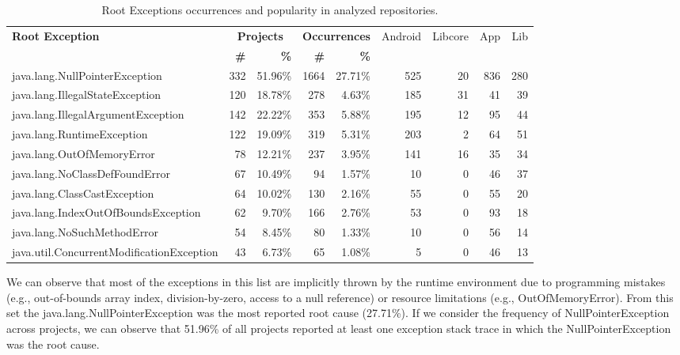 \begin{table}
  \tiny
  \centering
  \begin{tabular}{lrrrrrrrr}
    \hline
    \bfseries{Root Exception} &  \multicolumn{2}{c}{\bfseries{Projects}} &  \multicolumn{2}{c}{\bfseries{Occurrences}} & \textsf{Android} & \textsf{Libcore} & \textsf{App} & \textsf{Lib} \\
    & \bfseries{\#} &  \bfseries{\%} & \bfseries{\# } & \bfseries{\% } &&&&\\
    \hline

java.lang.NullPointerException	&	332	&	51.96\%	&	1664	&	27.71\%	&	525	&	20	&	836	&	280	\\
java.lang.IllegalStateException	&	120	&	18.78\%	&	278	&	4.63\%	&	185	&	31	&	41	&	39	\\
java.lang.IllegalArgumentException	&	142	&	22.22\%	&	353	&	5.88\%	&	195	&	12	&	95	&	44	\\
java.lang.RuntimeException	&	122	&	19.09\%	&	319	&	5.31\%	&	203	&	2	&	64	&	51	\\
java.lang.OutOfMemoryError	&	78	&	12.21\%	&	237	&	3.95\%	&	141	&	16	&	35	&	34	\\
java.lang.NoClassDefFoundError	&	67	&	10.49\%	&	94	&	1.57\%	&	10	&	0	&	46	&	37	\\
java.lang.ClassCastException	&	64	&	10.02\%	&	130	&	2.16\%	&	55	&	0	&	55	&	20	\\
java.lang.IndexOutOfBoundsException	&	62	&	9.70\%	&	166	&	2.76\%	&	53	&	0	&	93	&	18	\\
java.lang.NoSuchMethodError	&	54	&	8.45\%	&	80	&	1.33\%	&	10	&	0	&	56	&	14	\\
java.util.ConcurrentModificationException	&	43	&	6.73\%	&	65	&	1.08\%	&	5	&	0	&	46	&	13	\\
    \hline
  \end{tabular}
\caption{Root Exceptions occurrences and popularity in analyzed repositories.}
\label{tab:topten}
\end{table}

We can observe that most of the exceptions in this list are implicitly thrown by the
 runtime environment due to programming mistakes  (e.g., out-of-bounds array index, division-by-zero, access to a null reference)
 or resource limitations (e.g., OutOfMemoryError).
From this set the java.lang.NullPointerException was the most reported root cause (27.71\%).
If we consider the frequency of NullPointerException
across projects, we can observe that 51.96\% of all projects reported at least one exception stack
trace in which the NullPointerException was the root cause.

